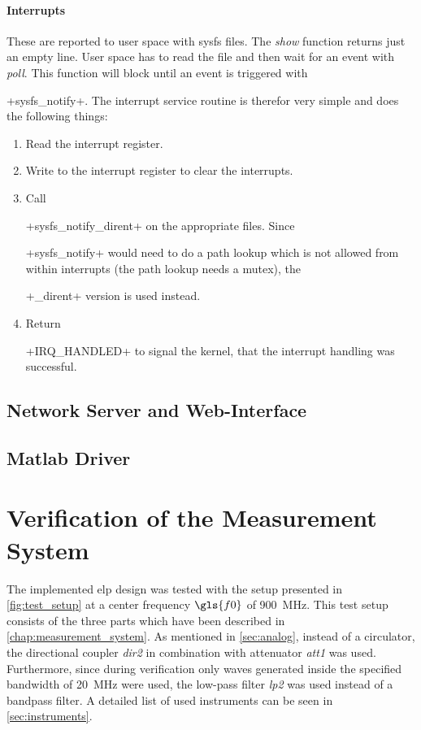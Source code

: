 \documentclass[12pt,a4paper,parskip=full,abstract=true,BCOR=12mm,twoside,open=right]{scrreprt}
\newcommand*{\SavedLstInline}{}
\DeclareRobustCommand*{\lstinline}{%
  \ifmmode
    \let\SavedBGroup\bgroup
    \def\bgroup{%
      \let\bgroup\SavedBGroup
      \hbox\bgroup
    }%
  \fi
  \SavedLstInline
}
\def\device#1{\textit{#1}}
\begin{document}
\subsubsection{Interrupts}
These are reported to user space with sysfs files. The \emph{show} function
returns just an empty line. User space has to read the file and then wait for
an event with \emph{poll}. This function will block until an event is
triggered with \lstinline+sysfs_notify+. The interrupt service routine is
therefor very simple and does the following things:
\begin{enumerate}
    \item Read the interrupt register.
    \item Write to the interrupt register to clear the interrupts.
    \item Call \lstinline+sysfs_notify_dirent+ on the appropriate files. Since
        \lstinline+sysfs_notify+ would need to do a path lookup which is not
        allowed from within interrupts (the path lookup needs a mutex), the
        \lstinline+_dirent+ version is used instead.
    \item Return \lstinline+IRQ_HANDLED+ to signal the kernel, that the
        interrupt handling was successful.
\end{enumerate}
\section{Network Server and Web-Interface}
\section{Matlab Driver}
\label{sec:matlab}



\chapter{Verification of the Measurement System}
\label{chap:verification}
\lstset{language=matlab}

The implemented \gls{elp} design was tested with the setup presented in
\cref{fig:test_setup} at a center frequency $\gls{f0}$ of \SI{900}{\mega\hertz}. This test setup consists of the three parts
which have been described in \cref{chap:measurement_system}. As mentioned in
\cref{sec:analog}, instead of a circulator, the directional coupler
\device{dir2} in combination with attenuator \device{att1} was used.
Furthermore, since during verification only waves generated inside
the specified bandwidth of \SI{20}{\mega\hertz} were used, the low-pass filter \device{lp2}
was used instead of a bandpass filter. A detailed list of used
instruments can be seen in \cref{sec:instruments}.
\end{document}

